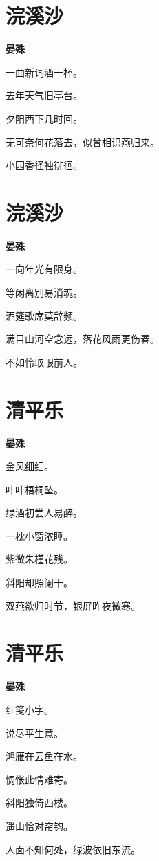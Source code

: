 \documentclass[12pt,a4paper]{ctexbook}
\begin{document}
\section{浣溪沙}
\textbf{晏殊}\par\vspace{0.5em}
一曲新词酒一杯。\par
去年天气旧亭台。\par
夕阳西下几时回。\par
无可奈何花落去，似曾相识燕归来。\par
小园香径独徘徊。\par

\section{浣溪沙}
\textbf{晏殊}\par\vspace{0.5em}
一向年光有限身。\par
等闲离别易消魂。\par
酒筵歌席莫辞频。\par
满目山河空念远，落花风雨更伤春。\par
不如怜取眼前人。\par

\section{清平乐}
\textbf{晏殊}\par\vspace{0.5em}
金风细细。\par
叶叶梧桐坠。\par
绿酒初尝人易醉。\par
一枕小窗浓睡。\par
紫微朱槿花残。\par
斜阳却照阑干。\par
双燕欲归时节，银屏昨夜微寒。\par

\section{清平乐}
\textbf{晏殊}\par\vspace{0.5em}
红笺小字。\par
说尽平生意。\par
鸿雁在云鱼在水。\par
惆怅此情难寄。\par
斜阳独倚西楼。\par
遥山恰对帘钩。\par
人面不知何处，绿波依旧东流。\par
\end{document}
